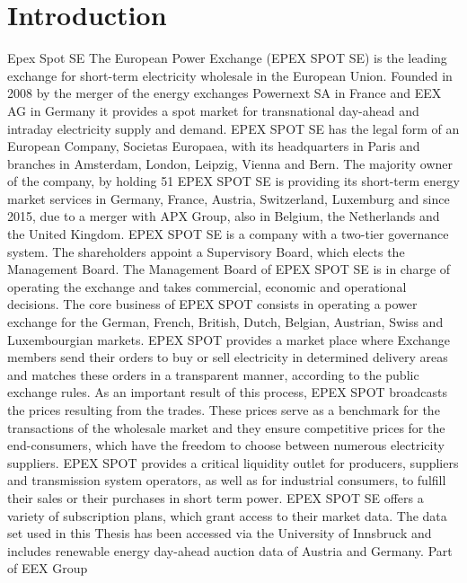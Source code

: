 \chapter{Introduction}

Epex Spot SE 
The European Power Exchange (EPEX SPOT SE) is the leading exchange for short-term electricity wholesale in the European Union. Founded in 2008 by the merger of the energy exchanges Powernext SA in France and EEX AG in Germany it provides a spot market for transnational day-ahead and intraday electricity supply and demand. EPEX SPOT SE has the legal form of an European Company, Societas Europaea, with its headquarters in Paris and branches in Amsterdam, London, Leipzig, Vienna and Bern. The majority owner of the company, by holding 51 %
EPEX SPOT SE is providing its short-term energy market services in Germany, France, Austria, Switzerland, Luxemburg and since 2015, due to a merger with APX Group, also in Belgium, the Netherlands and the United Kingdom. 
EPEX SPOT SE is a company with a two-tier governance system. The shareholders appoint a Supervisory Board, which elects the Management Board. The Management Board of EPEX SPOT SE is in charge of operating the exchange and takes commercial, economic and operational decisions. 
The core business of EPEX SPOT consists in operating a power exchange for the German, French, British, Dutch, Belgian, Austrian, Swiss and Luxembourgian markets.
EPEX SPOT provides a market place where Exchange members send their orders to buy or sell electricity in determined delivery areas and matches these orders in a transparent manner, according to the public exchange rules. As an important result of this process, EPEX SPOT broadcasts the prices resulting from the trades.
These prices serve as a benchmark for the transactions of the wholesale market and they ensure competitive prices for the end-consumers, which have the freedom to choose between numerous electricity suppliers. EPEX SPOT provides a critical liquidity outlet for producers, suppliers and transmission system operators, as well as for industrial consumers, to fulfill their sales or their purchases in short term power.
EPEX SPOT SE offers a variety of subscription plans, which grant access to their market data. The data set used in this Thesis has been accessed via the University of Innsbruck and includes renewable energy day-ahead auction data of Austria and Germany. 
Part of EEX Group
